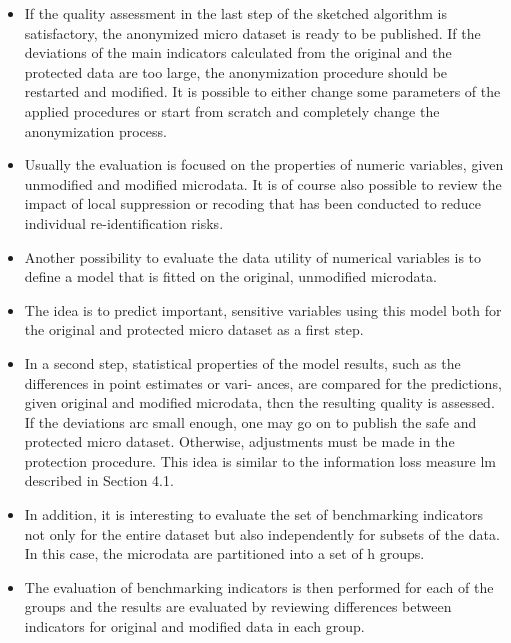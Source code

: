\documentclass[]{article}
\begin{document}
\begin{itemize}

\item If the quality assessment in the last step of the sketched algorithm is satisfactory,
the anonymized micro dataset is ready to be published. If the deviations of the
main indicators calculated from the original and the protected data are too large,
the anonymization procedure should be restarted and modiﬁed. It is possible to
either change some parameters of the applied procedures or start from scratch and
completely change the anonymization process.
\item Usually the evaluation is focused on the properties of numeric variables, given
unmodiﬁed and modiﬁed microdata. It is of course also possible to review the impact of local suppression or recoding that has been conducted to reduce individual re-identiﬁcation risks. 
\item Another possibility to evaluate the data utility of numerical
variables is to deﬁne a model that is ﬁtted on the original, unmodiﬁed microdata.
\item The idea is to predict important, sensitive variables using this model both for the
original and protected micro dataset as a ﬁrst step. 


\item In a second step, statistical
properties of the model results, such as the differences in point estimates or vari-
ances, are compared for the predictions, given original and modiﬁed microdata,
thcn the resulting quality is assessed. If the deviations arc small enough, one may
go on to publish the safe and protected micro dataset. Otherwise, adjustments
must be made in the protection procedure. This idea is similar to the information
loss measure lm described in Section 4.1.
\item In addition, it is interesting to evaluate the set of benchmarking indicators not
only for the entire dataset but also independently for subsets of the data. In
this case, the microdata are partitioned into a set of h groups. 
\item The evaluation of
benchmarking indicators is then performed for each of the groups and the results
are evaluated by reviewing differences between indicators for original and modiﬁed
data in each group. 
\end{itemize}
\end{document}
